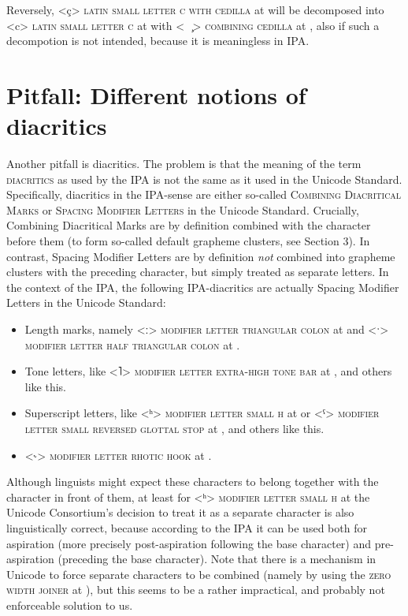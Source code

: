 Reversely, <ç> \textsc{latin small letter c with cedilla} at  will be
decomposed into <c> \textsc{latin small letter c} at  with 
<\ \ {\large  ̧}> \textsc{combining cedilla} at , 
also if such a decompotion is not intended, because it is meaningless in IPA.

\section{Pitfall: Different notions of diacritics}
\label{pitfall-the-ipa-notion-of-diacritics-is-not-the-same-as-the-unicode-standards-notion-of-diacritics}

Another pitfall is diacritics. The problem is that the meaning of the term
\textsc{diacritics} as used by the IPA is not the same as it used in the Unicode
Standard. Specifically, diacritics in the IPA-sense are either so-called
\textsc{Combining Diacritical Marks} or \textsc{Spacing Modifier Letters} in the
Unicode Standard. Crucially, Combining Diacritical Marks are by definition
combined with the character before them (to form so-called default grapheme
clusters, see Section 3). In contrast, Spacing Modifier Letters are by
definition \emph{not} combined into grapheme clusters with the preceding
character, but simply treated as separate letters. In the context of the IPA,
the following IPA-diacritics are actually Spacing Modifier Letters in the
Unicode Standard:

\begin{itemize}
	\item Length marks, namely <ː> \textsc{modifier letter triangular colon} at  and <ˑ> \textsc{modifier letter half triangular colon} at . 
	\item Tone letters, like <˥> \textsc{modifier letter extra-high tone bar} at , and others like this. 
	\item Superscript letters, like <ʰ> \textsc{modifier letter small h} at  or <ˤ> \textsc{modifier letter small reversed glottal stop} at , and others like this. 
	\item <˞> \textsc{modifier letter rhotic hook} at . 
\end{itemize}

Although linguists might expect these characters to belong together with the
character in front of them, at least for <ʰ> \textsc{modifier letter small h} at
 the Unicode Consortium's decision to treat it as a separate character
is also linguistically correct, because according to the IPA it can be used both
for aspiration (more precisely post-aspiration following the base character) and
pre-aspiration (preceding the base character). Note that there is a mechanism in
Unicode to force separate characters to be combined (namely by using the
\textsc{zero width joiner} at ), but this seems to be a rather
impractical, and probably not enforceable solution to us.

